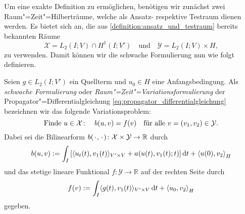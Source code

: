 \documentclass[../main.tex]{subfiles}
\begin{document}
Um eine exakte Definition zu ermöglichen, benötigen wir zunächst zwei Raum"=Zeit"=Hilberträume, welche als Ansatz- respektive Testraum dienen werden.
Es bietet sich an, die aus \cref{definition:ansatz_und_testraum} bereits bekannten Räume
\begin{equation}
    \label{eq:raum_zeit_ansatzraum_testraum}
    \mathcal X = L_{2}(I; V) \cap H^{1}(I; V')
    \quad \text{und} \quad
    \mathcal Y = L_{2}(I; V) \times H,
\end{equation}
zu verwenden.
Damit können wir die schwache Formulierung nun wie folgt definieren.

\begin{Definition}
\label{definition:raum_zeit_variationsformulierung}
    Seien $g \in L_{2}(I; V')$ ein Quellterm und $u_{0} \in H$ eine Anfangsbedingung.
    Als \emph{schwache Formulierung} oder \emph{Raum"=Zeit"=Variationsformulierung} der Propagator"=Differentialgleichung \cref{eq:propagator_differentialgleichung} bezeichnen wir das folgende Variationsproblem:
    \begin{equation}
    \label{eq:raum_zeit_variationsformulierung}
        \text{Finde}~u \in \mathcal X \colon \quad  b(u, v) = f(v) \quad \fa v = (v_{1}, v_{2}) \in \mathcal Y.
    \end{equation}
    Dabei sei die Bilinearform $b({\mkern2mu\cdot\mkern2mu}, {\mkern2mu\cdot\mkern2mu}) \colon \mathcal X \times \mathcal Y \to \mathbb{R}$ durch
    \begin{equation}
        \label{eq:raum_zeit_variationsformulierung:lhs}
        b(u, v)
            := \int_{I} \left[ \skp{u_{t}(t)}{v_{1}(t)}{V' \times V} + a(u(t), v_{1}(t); t) \right]  \diff t + \skprod{u(0)}{v_{2}}_{H}
    \end{equation}
    und das stetige lineare Funktional $f \colon \mathcal Y \to \mathbb{R}$ auf der rechten Seite durch
    \begin{equation}
        \label{eq:raum_zeit_variationsformulierung:rhs}
        f(v) := \int_{I} \skp{g(t)}{v_{1}(t)}{V' \times V} \diff t + \skprod{u_{0}}{v_{2}}_{H}
    \end{equation}
    gegeben.
\end{Definition}
\end{document}
